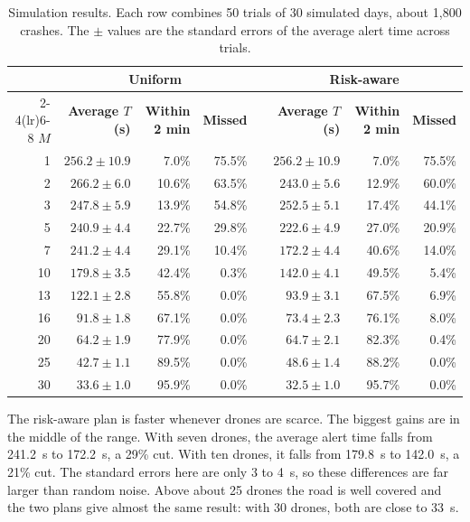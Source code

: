 \documentclass[11pt]{article}
\begin{document}
\begin{table}[htbp]
\centering
\caption{Simulation results. Each row combines 50 trials of 30 simulated days,
about 1{,}800 crashes. The $\pm$ values are the standard errors of the average
alert time across trials.}
\label{tab:sweep}
\small
\begin{tabular}{@{}rrrrcrrr@{}}
\toprule
& \multicolumn{3}{c}{\textbf{Uniform}} & & \multicolumn{3}{c}{\textbf{Risk-aware}}\\
\cmidrule(lr){2-4}\cmidrule(lr){6-8}
$M$ & \textbf{Average $T$ (s)} & \textbf{Within 2 min} & \textbf{Missed} & & \textbf{Average $T$ (s)} & \textbf{Within 2 min} & \textbf{Missed} \\
\midrule
1  & $256.2\pm10.9$ & 7.0\%  & 75.5\% & & $256.2\pm10.9$ & 7.0\%  & 75.5\% \\
2  & $266.2\pm6.0$  & 10.6\% & 63.5\% & & $243.0\pm5.6$  & 12.9\% & 60.0\% \\
3  & $247.8\pm5.9$  & 13.9\% & 54.8\% & & $252.5\pm5.1$  & 17.4\% & 44.1\% \\
5  & $240.9\pm4.4$  & 22.7\% & 29.8\% & & $222.6\pm4.9$  & 27.0\% & 20.9\% \\
7  & $241.2\pm4.4$  & 29.1\% & 10.4\% & & $172.2\pm4.4$  & 40.6\% & 14.0\% \\
10 & $179.8\pm3.5$  & 42.4\% & 0.3\%  & & $142.0\pm4.1$  & 49.5\% & 5.4\%  \\
13 & $122.1\pm2.8$  & 55.8\% & 0.0\%  & & $93.9\pm3.1$   & 67.5\% & 6.9\%  \\
16 & $91.8\pm1.8$   & 67.1\% & 0.0\%  & & $73.4\pm2.3$   & 76.1\% & 8.0\%  \\
20 & $64.2\pm1.9$   & 77.9\% & 0.0\%  & & $64.7\pm2.1$   & 82.3\% & 0.4\%  \\
25 & $42.7\pm1.1$   & 89.5\% & 0.0\%  & & $48.6\pm1.4$   & 88.2\% & 0.0\%  \\
30 & $33.6\pm1.0$   & 95.9\% & 0.0\%  & & $32.5\pm1.0$   & 95.7\% & 0.0\%  \\
\bottomrule
\end{tabular}
\end{table}

The risk-aware plan is faster whenever drones are scarce. The biggest gains are
in the middle of the range. With seven drones, the average alert time falls
from 241.2~s to 172.2~s, a 29\% cut. With ten drones, it falls from 179.8~s to
142.0~s, a 21\% cut. The standard errors here are only 3 to 4~s, so these
differences are far larger than random noise. Above about 25 drones the road is
well covered and the two plans give almost the same result: with 30 drones,
both are close to 33~s.
\end{document}
